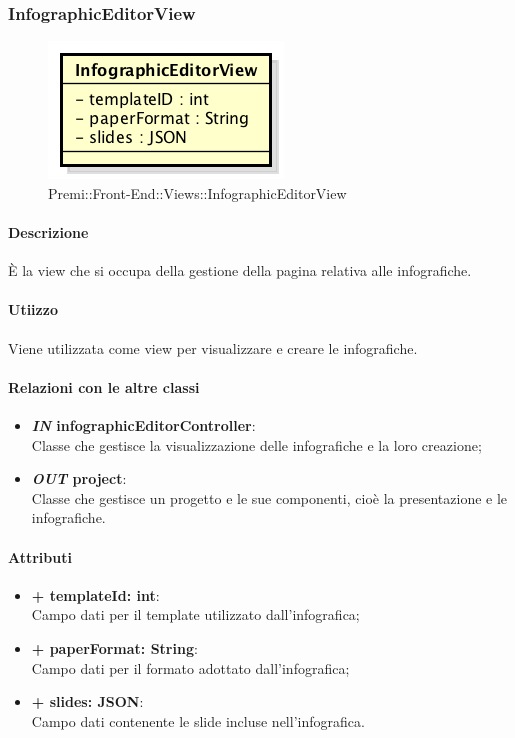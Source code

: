 	
\subsubsection{InfographicEditorView}
	\begin{figure}[h]
		\centering
		\includegraphics[width=0.4\linewidth]{img/premi_front_end_views_infographiceditorview}
		\caption[Premi::Front-End::Views::InfographicEditorView]{Premi::Front-End::Views::InfographicEditorView}
	\end{figure}
	
	\paragraph{Descrizione}
	È la view che si occupa della gestione della pagina relativa alle infografiche.
	
	\paragraph{Utiizzo}
	Viene utilizzata come view per visualizzare e creare le infografiche.
	
	\paragraph{Relazioni con le altre classi}
	\begin{itemize}
		\item \textbf{\textit{IN} infographicEditorController}:\\
		Classe che gestisce la visualizzazione delle infografiche e la loro creazione;
		\item \textbf{\textit{OUT} project}:\\
		Classe che gestisce un progetto e le sue componenti, cioè la presentazione e le infografiche.
	\end{itemize}
	
	\paragraph{Attributi}
	\begin{itemize}
		\item \textbf{+ templateId: int}:\\
		Campo dati per il template utilizzato dall'infografica;
		\item \textbf{+ paperFormat: String}:\\
		Campo dati per il formato adottato dall'infografica;
		\item \textbf{+ slides: JSON}:\\
		Campo dati contenente le slide incluse nell'infografica.
	\end{itemize}
	
